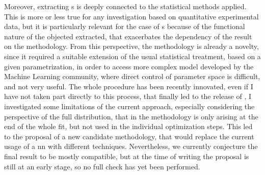 Moreover, extracting \pdf{}s is deeply connected to the statistical methods
applied.
This is more or less true for any investigation based on quantitative
experimental data, but it is particularly relevant for the case of \pdf{}s
because of the functional nature of the objected extracted, that exacerbates
the dependency of the result on the methodology.
From this perspective, the \nnpdf methodology is already a novelty, since it
required a suitable extension of the usual statistical treatment, based on a
given parametrization, in order to access more complex model developed by the
Machine Learning community, where direct control of parameter space is
difficult, and not very useful.
The whole procedure has been recently innovated, even if I have not taken part
directly to this process, that finally led to the release of 
\cite{NNPDF:2021njg}, I investigated some limitations of the current approach,
especially considering the perspective of the full distribution, that in the
\nnpdf methodology is only arising at the end of the whole fit, but not used in
the individual optimization steps.
This led to the proposal of a new candidate methodology, that would replace the
current usage of a \acrfull{nn} with different techniques.
Nevertheless, we currently conjecture the final result to be mostly compatible,
but at the time of writing the proposal is still at an early stage, so no full
check has yet been performed.
